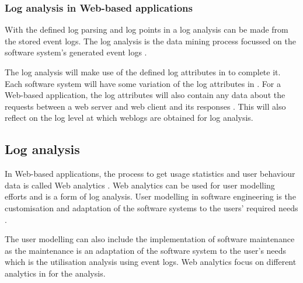 \subsubsection{Log analysis in Web-based applications}
With the defined log parsing and log points in  a log analysis can be made from the stored event logs. The log analysis is the data mining process focussed on the software system's generated event logs \cite{Slaninova2014,Hasiloglu2018}.\par The log analysis will make use of the defined log attributes in  to complete it. Each software system will have some variation of the log attributes in . For a Web-based application, the log attributes will also contain any data about the requests between a web server and web client and its responses \cite{Slaninova2014, Dhanalakshmi2016}. This will also reflect on the log level at which weblogs are obtained for log analysis.


\subsection{Log analysis}\label{sec:ch1_systemUtilisation}
In Web-based applications, the process to get usage statistics and user behaviour data is called Web analytics \cite{Kocsis2012}. Web analytics can be used for user modelling efforts and is a form of log analysis. User modelling in software engineering is the customisation and adaptation of the software systems to the users' required needs \cite{Waqar2017, Paliouras1999}.\par The user modelling can also include the implementation of software maintenance as the maintenance is an adaptation of the software system to the user's needs which is the utilisation analysis using event logs. Web analytics focus on different analytics in  for the analysis. 

